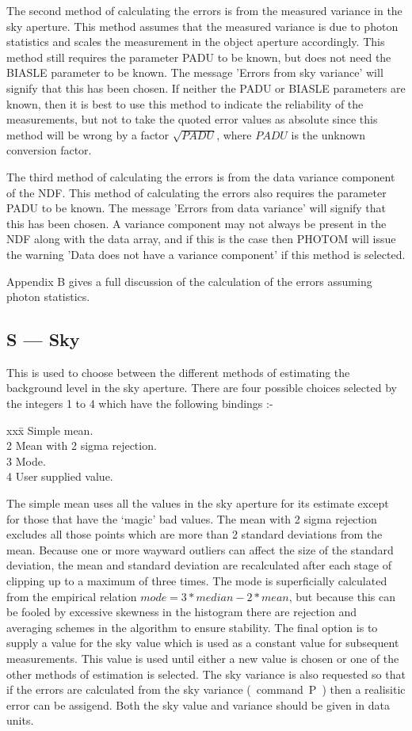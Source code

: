 The second method of calculating the errors is from the measured
variance in the sky aperture. This method assumes that the measured
variance is due to photon statistics and scales the measurement in
the object aperture accordingly. This method still requires the
parameter PADU to be known, but does not need the BIASLE parameter to
be known. The message 'Errors from sky variance' will signify that
this has been chosen. If neither the PADU or BIASLE parameters are
known, then it is best to use this method to indicate the reliability
of the measurements, but not to take the quoted error values as
absolute since this method will be wrong by a factor $\sqrt{PADU}$,
where $PADU$ is the unknown conversion factor.

The third method of calculating the errors is from the data variance
component of the NDF. This method of calculating the errors also
requires the parameter PADU to be known. The message 'Errors from
data variance' will signify that this has been chosen. A variance
component may not always be present in the NDF along with the data
array, and if this is the case then PHOTOM will issue the warning
'Data does not have a variance component' if this method is selected. 

Appendix B gives a full discussion of the calculation of the errors
assuming photon statistics.

\subsection{S --- Sky}

This is used to choose between the different methods of estimating the
background level in the sky aperture. There are four possible choices
selected by the integers 1 to 4 which have the following bindings :-
\begin{tabbing}
xxx\=  \> Simple mean. \\
2 \> Mean with 2 sigma rejection. \\
3 \> Mode. \\
4 \> User supplied value.
\end{tabbing}
The simple mean uses all the values in the sky aperture for its estimate
except for those that have the `magic' bad values. The mean with 2 sigma
rejection excludes all those points which are more than 2 standard
deviations from the mean. Because one or more wayward outliers can
affect the size of the standard deviation, the mean and standard deviation
are recalculated after each stage of clipping up to a maximum of three
times.
The mode is superficially calculated from the empirical relation
$mode = 3 * median - 2 * mean$, but because this can be fooled by
excessive skewness in the histogram there are rejection and averaging
schemes in the algorithm to ensure stability. The final option is to
supply a value for the sky value which is used as a constant value for
subsequent measurements. This value is used until either a new value is
chosen or one of the other methods of estimation is selected. The sky
variance is also requested so that if the errors are calculated from the
sky variance (~command~P~) then a realisitic error can be assigend. Both
the sky value and variance should be given in data units.

